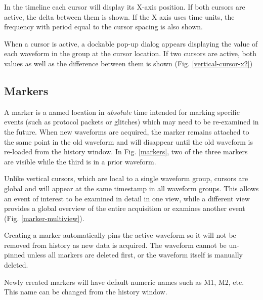 In the timeline each cursor will display its X-axis position. If both cursors are active, the delta between them
is shown. If the X axis uses time units, the frequency with period equal to the cursor spacing is also shown.

When a cursor is active, a dockable pop-up dialog appears displaying the value of each waveform in the group at the
cursor location. If two cursors are active, both values as well as the difference between them is shown (Fig.
\ref{vertical-cursor-x2})

\subsection{Markers}
\label{sec:markers}

A marker is a named location in \emph{absolute} time intended for marking specific events (such as protocol packets or
glitches) which may need to be re-examined in the future. When new waveforms are acquired, the marker remains attached
to the same point in the old waveform and will disappear until the old waveform is re-loaded from the history window.
In Fig. \ref{markers}, two of the three markers are visible while the third is in a prior waveform.

Unlike vertical cursors, which are local to a single waveform group, cursors are global and will appear at the same
timestamp in all waveform groups. This allows an event of interest to be examined in detail in one view, while a
different view provides a global overview of the entire acquisition or examines another event (Fig.
\ref{marker-multiview}).

Creating a marker automatically pins the active waveform so it will not be removed from history as new data is
acquired. The waveform cannot be un-pinned unless all markers are deleted first, or the waveform itself is manually
deleted.

Newly created markers will have default numeric names such as M1, M2, etc. This name can be changed from the history
window.

